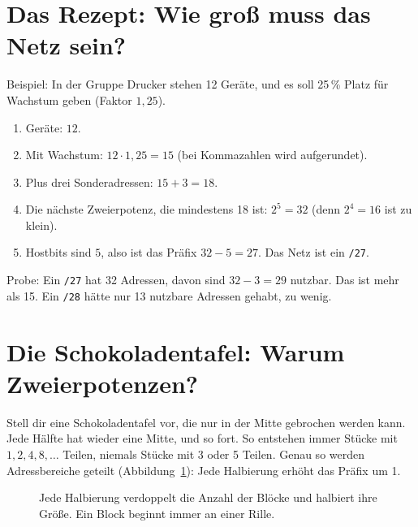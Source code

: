 \documentclass[a4paper,12pt, twoside]{report}
\theoremstyle{definition}
\begin{document}
\section{Das Rezept: Wie groß muss das Netz sein?}

Beispiel: In der Gruppe \glqq Drucker\grqq{} stehen 12 Geräte, und es soll 25\,\% Platz für Wachstum geben (Faktor $1{,}25$).
\begin{enumerate}
	\item Geräte: $12$.
	\item Mit Wachstum: $12 \cdot 1{,}25 = 15$ (bei Kommazahlen wird aufgerundet).
	\item Plus drei Sonderadressen: $15 + 3 = 18$.
	\item Die nächste Zweierpotenz, die mindestens 18 ist: $2^5 = 32$ (denn $2^4 = 16$ ist zu klein).
	\item Hostbits sind $5$, also ist das Präfix $32 - 5 = 27$. Das Netz ist ein \texttt{/27}.
\end{enumerate}
Probe: Ein \texttt{/27} hat 32 Adressen, davon sind $32-3 = 29$ nutzbar. Das ist mehr als 15. Ein \texttt{/28} hätte nur 13 nutzbare Adressen gehabt, zu wenig.

\section{Die Schokoladentafel: Warum Zweierpotenzen?}

Stell dir eine Schokoladentafel vor, die nur in der Mitte gebrochen werden kann. Jede Hälfte hat wieder eine Mitte, und so fort. So entstehen immer Stücke mit $1, 2, 4, 8, \dots$ Teilen, niemals Stücke mit 3 oder 5 Teilen. Genau so werden Adressbereiche geteilt (Abbildung~\ref{fig:halbierung}): Jede Halbierung erhöht das Präfix um 1.

\begin{figure}[ht]
\centering
{}
\caption{Jede Halbierung verdoppelt die Anzahl der Blöcke und halbiert ihre Größe. Ein Block beginnt immer an einer \glqq Rille\grqq.}
\label{fig:halbierung}
\end{figure}
\end{document}
